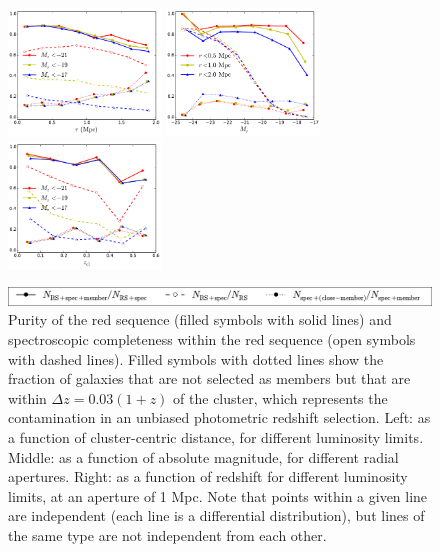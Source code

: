 \begin{figure}
 \centerline{\includegraphics[width=1.6in]{chapter4/rspurity-distance.pdf}
             \includegraphics[width=1.6in]{chapter4/rspurity-mabsolute.pdf}
             \includegraphics[width=1.6in]{chapter4/rspurity-redshift-1Mpc.pdf}}
 \centerline{\includegraphics[width=4.8in]{chapter4/rspurity_legend.pdf}}
\caption{\small Purity of the red sequence (filled symbols with solid lines) and spectroscopic 
completeness within the red sequence (open symbols with dashed lines). Filled symbols with dotted 
lines show the fraction of galaxies that are not selected as members but that are within $\Delta 
z=0.03(1+z)$ of the cluster, which represents the contamination in an unbiased photometric redshift 
selection. Left: as a function of cluster-centric distance, for different luminosity 
limits. Middle: as a function of absolute magnitude, for different radial apertures. 
Right: as a function of redshift for different luminosity limits, at an aperture of 1 Mpc. 
Note that points within a given line are independent (each line is a differential distribution), 
but lines of the same type are not independent from each other.}
\label{f:rspurity}
\end{figure}

